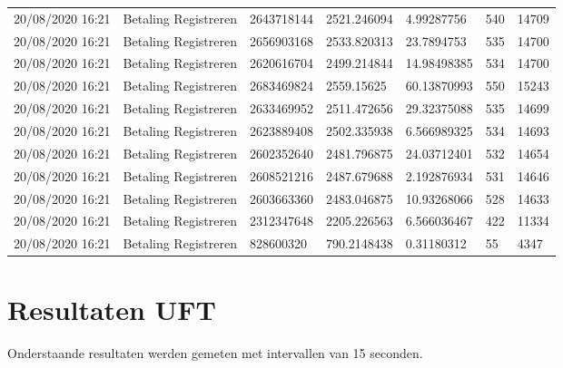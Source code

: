 \begin{tiny}
\begin{longtable}{lllllll}
    20/08/2020 16:21 & Betaling Registreren  & 2643718144        & 2521.246094 & 4.99287756            & 540              & 14709            \\
    20/08/2020 16:21 & Betaling Registreren  & 2656903168        & 2533.820313 & 23.7894753            & 535              & 14700            \\
    20/08/2020 16:21 & Betaling Registreren  & 2620616704        & 2499.214844 & 14.98498385           & 534              & 14700            \\
    20/08/2020 16:21 & Betaling Registreren  & 2683469824        & 2559.15625  & 60.13870993           & 550              & 15243            \\
    20/08/2020 16:21 & Betaling Registreren  & 2633469952        & 2511.472656 & 29.32375088           & 535              & 14699            \\
    20/08/2020 16:21 & Betaling Registreren  & 2623889408        & 2502.335938 & 6.566989325           & 534              & 14693            \\
    20/08/2020 16:21 & Betaling Registreren  & 2602352640        & 2481.796875 & 24.03712401           & 532              & 14654            \\
    20/08/2020 16:21 & Betaling Registreren  & 2608521216        & 2487.679688 & 2.192876934           & 531              & 14646            \\
    20/08/2020 16:21 & Betaling Registreren  & 2603663360        & 2483.046875 & 10.93268066           & 528              & 14633            \\
    20/08/2020 16:21 & Betaling Registreren  & 2312347648        & 2205.226563 & 6.566036467           & 422              & 11334            \\
    20/08/2020 16:21 & Betaling Registreren  & 828600320         & 790.2148438 & 0.31180312            & 55               & 4347            
\end{longtable}
\end{tiny}

\section{Resultaten UFT}

Onderstaande resultaten werden gemeten met intervallen van 15 seconden.

